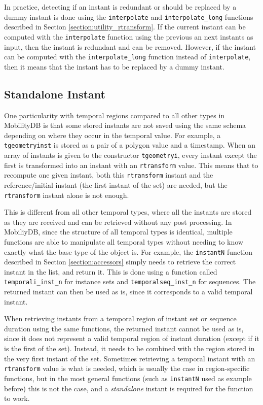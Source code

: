 In practice, detecting if an instant is redundant or should be replaced by a dummy instant is done using the \lstinline{interpolate} and \lstinline{interpolate_long} functions described in Section \ref{section:utility_rtransform}. If the current instant can be computed with the \lstinline{interpolate} function using the previous an next instants as input, then the instant is redundant and can be removed. However, if the instant can be computed with the \lstinline{interpolate_long} function instead of \lstinline{interpolate}, then it means that the instant has to be replaced by a dummy instant.

\subsection{Standalone Instant}
\label{section:standalone_inst}

One particularity with temporal regions compared to all other types in MobilityDB is that some stored instants are not saved using the same  schema depending on where they occur in the temporal value. For example, a \lstinline{tgeometryinst} is stored as a pair of a polygon value and a timestamp. When an array of instants is given to the constructor \lstinline{tgeometryi}, every instant except the first is transformed into an instant with an \lstinline{rtransform} value. This means that to recompute one given instant, both this \lstinline+rtransform+ instant and the reference/initial instant (the first instant of the set) are needed, but the \lstinline+rtransform+ instant alone is not enough. 

This is different from all other temporal types, where all the instants are stored as they are received and can be retrieved without any post processing. In MobiliyDB, since the structure of all temporal types is identical, multiple functions are able to manipulate all temporal types without needing to know exactly what the base type of the object is. For example, the \lstinline{instantN} function described in Section \ref{section:accessors} simply needs to retrieve the correct instant in the list, and return it. This is done using a function called \lstinline{temporali_inst_n} for instance sets and \lstinline{temporalseq_inst_n} for sequences. The returned instant can then be used as is, since it corresponds to a valid temporal instant.

When retrieving instants from a temporal region of instant set or sequence duration using the same functions, the returned instant cannot be used as is, since it does not represent a valid temporal region of instant duration (except if it is the first of the set). Instead, it needs to be combined with the region stored in the very first instant of the set. Sometimes retrieving a temporal instant with an \lstinline+rtransform+ value is what is needed, which is usually the case in region-specific functions, but in the most general functions (such as \lstinline{instantN} used as example before) this is not the case, and a \textit{standalone} instant is required for the function to work.

